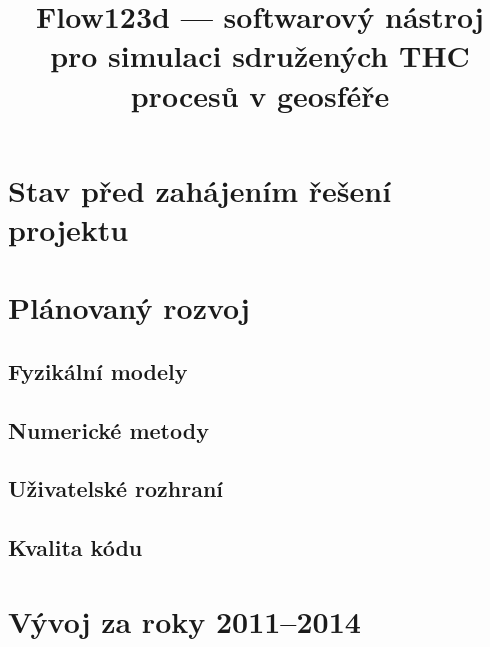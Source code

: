 \documentclass{article}
\begin{document}
\title{Flow123d --- softwarový nástroj pro simulaci sdružených THC procesů v geosféře}
\maketitle


\section{Stav před zahájením řešení projektu}



\section{Plánovaný rozvoj}

\subsection{Fyzikální modely}

\subsection{Numerické metody}

\subsection{Uživatelské rozhraní}

\subsection{Kvalita kódu}




\section{Vývoj za roky 2011--2014}
\end{document}
